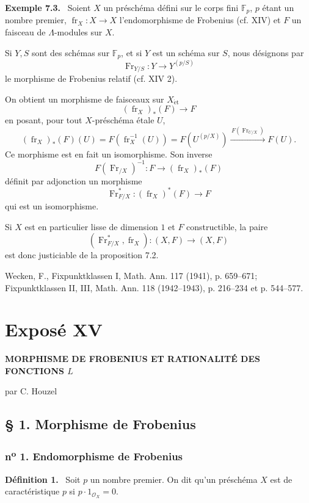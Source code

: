 \documentclass[11pt]{article}
\newenvironment{statement}[1]{\par\medskip\noindent\textbf{#1.}\ }{\par\medskip}
\providecommand{\et}{\mathrm{\acute{e}t}}
\providecommand{\OO}{\mathcal{O}}
\providecommand{\fr}{\operatorname{fr}}
\providecommand{\Fr}{\operatorname{Fr}}
\begin{document}
\begin{statement}{Exemple 7.3}
Soient $X$ un préschéma défini sur le corps fini $\mathbb F_p$, $p$ étant un nombre premier, $\fr_X:X\to X$ l'endomorphisme de Frobenius (cf. XIV) et $F$ un faisceau de $\Lambda$-modules sur $X$.

Si $Y,S$ sont des schémas sur $\mathbb F_p$, et si $Y$ est un schéma sur $S$, nous désignons par
\[
\Fr_{Y/S}:Y\longrightarrow Y^{(p/S)}
\]
le morphisme de Frobenius relatif (cf. XIV 2).

On obtient un morphisme de faisceaux sur $X_{\et}$
\[
(\fr_X)_*(F)\longrightarrow F
\]
en posant, pour tout $X$-préschéma étale $U$,
\[
(\fr_X)_*(F)(U)=F(\fr_X^{-1}(U))=F(U^{(p/X)})
 \xrightarrow{\,F(\Fr_{U/X})\,}F(U).
\]
Ce morphisme est en fait un isomorphisme. Son inverse
\[
F(\Fr_{/X})^{-1}:F\longrightarrow (\fr_X)_*(F)
\]
définit par adjonction un morphisme
\[
\Fr_{F/X}^*:(\fr_X)^*(F)\longrightarrow F
\]
qui est un isomorphisme.

Si $X$ est en particulier lisse de dimension $1$ et $F$ constructible, la paire
\[
(\Fr_{F/X}^*,\fr_X):(X,F)\longrightarrow (X,F)
\]
est donc justiciable de la proposition 7.2.
\end{statement}

\noindent[1] Wecken, F., Fixpunktklassen I, Math. Ann. 117 (1941), p. 659--671; Fixpunktklassen II, III, Math. Ann. 118 (1942--1943), p. 216--234 et p. 544--577.

\section*{Exposé XV}
\begin{center}
\Large\bfseries MORPHISME DE FROBENIUS ET RATIONALITÉ DES FONCTIONS $L$

\medskip
par C. Houzel
\end{center}

\subsection*{§ 1. Morphisme de Frobenius}

\subsubsection*{n\textsuperscript{o} 1. Endomorphisme de Frobenius}

\begin{statement}{Définition 1}
Soit $p$ un nombre premier. On dit qu'un préschéma $X$ est de caractéristique $p$ si $p\cdot 1_{\OO_X}=0$.
\end{statement}
\end{document}
